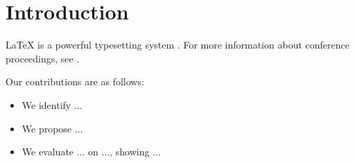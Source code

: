 \section{Introduction}
\label{sec:introduction}

LaTeX is a powerful typesetting system \cite{example2023}. For more information about conference proceedings, see \cite{conference2022}.



Our contributions are as follows:
\begin{itemize}
    \item We identify ... %
    \item We propose ... %
    \item We evaluate ... on ..., showing ... %
\end{itemize}

